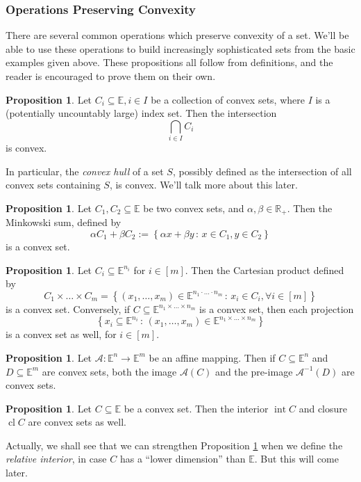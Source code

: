 \documentclass[11pt]{article}
\numberwithin{equation}{section}
\theoremstyle{definition}
\newtheorem{proposition}[theorem]{Proposition}
\newcommand{\bE}{\mathbb{E}}
\newcommand{\bR}{\mathbb{R}}
\newcommand{\cA}{\mathcal{A}}
\newcommand{\set}[2]{\left\{#1\,:\,#2\right\}}
\newcommand{\scl}{\operatorname{cl}}
\newcommand{\sint}{\operatorname{int}}
\begin{document}
\subsubsection{Operations Preserving Convexity}
There are several common operations which preserve convexity of a set. We'll be able to use these operations to build increasingly sophisticated sets from the basic examples given above. 
These propositions all follow from definitions, and the reader is encouraged to prove them on their own.
\begin{proposition}
    \label{propcvxintersection}
    Let $C_i\subseteq\bE, i\in I$ be a collection of convex sets, where $I$ is a (potentially uncountably large) index set. Then the intersection
    \begin{equation}
        \bigcap_{i\in I} C_i
    \end{equation}
    is convex.
\end{proposition}
In particular, the \textit{convex hull} of a set $S$, possibly defined as the intersection of all convex sets containing $S$, is convex. We'll talk more about this later.
\begin{proposition}
    Let $C_1, C_2\subseteq\bE$ be two convex sets, and $\alpha,\beta\in\bR_+$. Then the Minkowski sum, defined by
    \begin{equation}
        \alpha C_1+\beta C_2:=\set{\alpha x+\beta y}{x\in C_1, y\in C_2}
    \end{equation}
    is a convex set.
\end{proposition}
\begin{proposition}
    Let $C_i\subseteq\bE^{n_i}$ for $i\in[m]$. Then the Cartesian product defined by
    \begin{equation}
        C_1\times\dots\times C_m=\set{(x_1, \dots, x_m)\in\bE^{n_1\cdot\dots\cdot n_m}}{x_i\in C_i, \forall i\in[m]}
    \end{equation}
    is a convex set. Conversely, if $C\subseteq\bE^{{n_1}\times\dots\times{n_m}}$ is a convex set, then each projection
    \begin{equation}
        \set{x_i\subseteq\bE^{n_i}}{(x_1,\dots, x_m)\in\bE^{n_1\times\dots\times n_m}}
    \end{equation}
    is a convex set as well, for $i\in [m]$.
\end{proposition}
\begin{proposition}
    Let $\cA:\bE^n\to\bE^m$ be an affine mapping. Then if $C\subseteq\bE^n$ and $D\subseteq\bE^m$ are convex sets, both the image $\cA(C)$ and the pre-image $\cA^{-1}(D)$ are convex sets.
\end{proposition}
\begin{proposition}
    \label{prpconvexintcl}
    Let $C\subseteq\bE$ be a convex set. Then the interior $\sint C$ and closure $\scl C$ are convex sets as well.
\end{proposition}
Actually, we shall see that we can strengthen Proposition \ref{prpconvexintcl} when we define the \textit{relative interior}, in case $C$ has a ``lower dimension'' than $\bE$. But this will come later.
\end{document}
